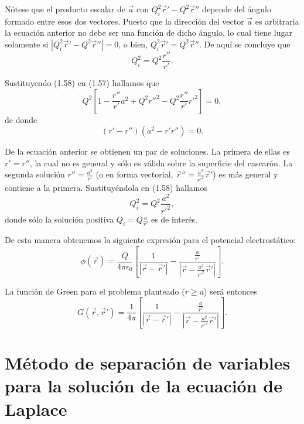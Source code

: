 \documentclass[12pt,a4paper]{book}
\begin{document}
Nótese que el producto escalar de $\vec{a}$ con $Q_i^2 \vec{r}' - Q^2\vec{r}''$ depende del ángulo formado entre esos dos vectores. Puesto que la dirección del vector $\vec{a}$ es arbitraria la ecuación anterior no debe ser una función de dicho ángulo, lo cual tiene lugar solamente si $|Q_i^2 \vec{r}' -Q^2\vec{r}''| = 0$, o bien, $Q_i^2 \vec{r}' = Q^2 \vec{r}''$. De aquí se concluye que
\begin{equation}
Q_i^2 = Q^2 \frac{r''}{r'}.
\end{equation}

Sustituyendo (1.58) en (1.57) hallamos que
\begin{equation}
Q^2\left[1 - \frac{r''}{r'}a^2 + Q^2 r''^2 - Q^2 \frac{r''}{r'}r'^2\right] = 0,
\end{equation}
de donde
\begin{equation}
(r' - r'')(a^2 - r' r'') = 0.
\end{equation}

De la ecuación anterior se obtienen un par de soluciones. La primera de ellas es $r' = r''$, la cual no es general y sólo es válida sobre la superficie del cascarón. La segunda solución $r'' = \frac{a^2}{r'}$ (o en forma vectorial, $\vec{r}'' = \frac{a^2}{r'^2}\vec{r}'$) es más general y contiene a la primera. Sustituyéndola en (1.58) hallamos
\begin{equation}
Q_i^2 = Q^2 \frac{a^2}{r'^2},
\end{equation}
donde sólo la solución positiva $Q_i = Q \frac{a}{r'}$ es de interés.

De esta manera obtenemos la siguiente expresión para el potencial electrostático:
\begin{equation}
\phi(\vec{r}) = \frac{Q}{4\pi\epsilon_0}\left[\frac{1}{|\vec{r} - \vec{r}'|} - \frac{\frac{a}{r'}}{|\vec{r} - \frac{a^2}{r'^2}\vec{r}'|}\right].
\end{equation}

La función de Green para el problema planteado ($r \geq a$) será entonces
\begin{equation}
G(\vec{r},\vec{r}') = \frac{1}{4\pi}\left[\frac{1}{|\vec{r} - \vec{r}'|} - \frac{\frac{a}{r'}}{|\vec{r} - \frac{a^2}{r'^2}\vec{r}'|}\right].
\end{equation}

\section{Método de separación de variables para la solución de la ecuación de Laplace}
\end{document}
